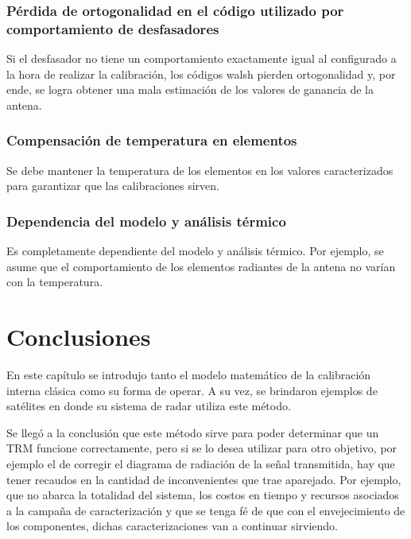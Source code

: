 \subsubsection{Pérdida de ortogonalidad en el código utilizado por comportamiento de desfasadores}

Si el desfasador no tiene un comportamiento exactamente igual al configurado a la hora de realizar la calibración, los códigos
walsh pierden ortogonalidad y, por ende, se logra obtener una mala estimación de los valores de ganancia de la antena.


\subsubsection{Compensación de temperatura en elementos}

Se debe mantener la temperatura de los elementos en los valores caracterizados para garantizar que las calibraciones sirven.


\subsubsection{Dependencia del modelo y análisis térmico}

Es completamente dependiente del modelo y análisis térmico. Por ejemplo, se asume que el comportamiento de los elementos
radiantes de la antena no varían con la temperatura.

\section{Conclusiones}

En este capítulo se introdujo tanto el modelo matemático de la calibración interna clásica como su forma de operar. A su vez,
se brindaron ejemplos de satélites en donde su sistema de radar utiliza este método.

Se llegó a la conclusión que este método sirve para poder determinar que un TRM funcione correctamente, pero si se lo desea
utilizar para otro objetivo, por ejemplo el de corregir el diagrama de radiación de la señal transmitida, hay que tener recaudos
en la cantidad de inconvenientes que trae aparejado. Por ejemplo, que no abarca la totalidad del sistema, los costos en tiempo y
recursos asociados a la campaña de caracterización y que se tenga fé de que con el envejecimiento de los componentes, dichas
caracterizaciones van a continuar sirviendo.

